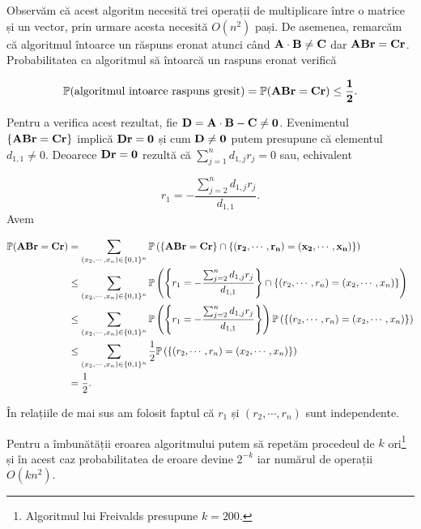 \documentclass[]{article}
\let\rmarkdownfootnote\footnote%
\def\footnote{\protect\rmarkdownfootnote}
\begin{document}
Observăm că acest algoritm necesită trei operații de multiplicare între
o matrice și un vector, prin urmare acesta necesită \(O(n^2)\) pași. De
asemenea, remarcăm că algoritmul întoarce un răspuns eronat atunci când
\(\bf{A}\cdot\bf{B}\neq\bf{C}\) dar
\(\bf{A}\bf{B}\bf{r} = \bf{C}\bf{r}\). Probabilitatea ca algoritmul să
întoarcă un raspuns eronat verifică

\[
  \mathbb{P}(\text{algoritmul intoarce raspuns gresit}) = \mathbb{P}(\bf{A}\bf{B}\bf{r} = \bf{C}\bf{r}) \leq \frac{1}{2}.
\]

Pentru a verifica acest rezultat, fie
\(\bf{D} = \bf{A}\cdot\bf{B}-\bf{C} \neq 0\). Evenimentul
\(\{\bf{A}\bf{B}\bf{r} = \bf{C}\bf{r}\}\) implică \(\bf{D}\bf{r}=0\) și
cum \(\bf{D}\neq 0\) putem presupune că elementul \(d_{1,1}\neq 0\).
Deoarece \(\bf{D}\bf{r}=0\) rezultă că \(\sum_{j=1}^{n}d_{1,j}r_j=0\)
sau, echivalent

\[
  r_1 = -\frac{\sum_{j=2}^{n}d_{1,j}r_j}{d_{1,1}}.
\] Avem

\begin{align*}
  \mathbb{P}(\bf{A}\bf{B}\bf{r} = \bf{C}\bf{r}) &= \sum_{(x_2,\cdots, x_n)\in\{0,1\}^n}\mathbb{P}\left(\{\bf{A}\bf{B}\bf{r} = \bf{C}\bf{r}\}\cap \{(r_2,\cdots, r_n) = (x_2,\cdots, x_n)\}\right)\\
      &\leq \sum_{(x_2,\cdots, x_n)\in\{0,1\}^n}\mathbb{P}\left(\left\{r_1 = -\frac{\sum_{j=2}^{n}d_{1,j}r_j}{d_{1,1}}\right\}\cap \{(r_2,\cdots, r_n) = (x_2,\cdots, x_n)\}\right)\\
      &\leq \sum_{(x_2,\cdots, x_n)\in\{0,1\}^n}\mathbb{P}\left(\left\{r_1 = -\frac{\sum_{j=2}^{n}d_{1,j}r_j}{d_{1,1}}\right\}\right)\mathbb{P}\left(\{(r_2,\cdots, r_n) = (x_2,\cdots, x_n)\}\right)\\
      &\leq \sum_{(x_2,\cdots, x_n)\in\{0,1\}^n}\frac{1}{2}\mathbb{P}\left(\{(r_2,\cdots, r_n) = (x_2,\cdots, x_n)\}\right)\\
      &= \frac{1}{2}.
\end{align*}

În relațiile de mai sus am folosit faptul că \(r_1\) și
\((r_2,\cdots, r_n)\) sunt independente.

Pentru a îmbunătății eroarea algoritmului putem să repetăm procedeul de
\(k\) ori\footnote{Algoritmul lui Freivalds presupune \(k = 200\).} și
în acest caz probabilitatea de eroare devine \(2^{-k}\) iar numărul de
operații \(O(kn^2)\).
\end{document}
